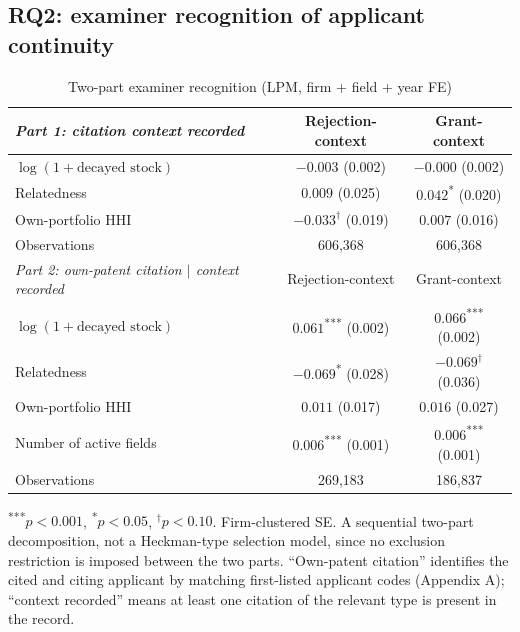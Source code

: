 \documentclass[12pt]{article}
\begin{document}
\subsection{RQ2: examiner recognition of applicant continuity}

\begin{table}[htbp]
\centering
\small
\caption{Two-part examiner recognition (LPM, firm + field + year FE)}
\label{tab:block2}
\begin{tabular}{lcc}
\toprule
\textit{Part 1: citation context recorded} & Rejection-context & Grant-context \\
\midrule
$\log(1+\text{decayed stock})$ & $-0.003$ (0.002) & $-0.000$ (0.002) \\
Relatedness & $0.009$ (0.025) & $0.042$\textsuperscript{*} (0.020) \\
Own-portfolio HHI & $-0.033^{\dagger}$ (0.019) & $0.007$ (0.016) \\
Observations & 606,368 & 606,368 \\
\midrule
\textit{Part 2: own-patent citation $\mid$ context recorded} & Rejection-context & Grant-context \\
\midrule
$\log(1+\text{decayed stock})$ & $0.061$\textsuperscript{***} (0.002) & $0.066$\textsuperscript{***} (0.002) \\
Relatedness & $-0.069$\textsuperscript{*} (0.028) & $-0.069^{\dagger}$ (0.036) \\
Own-portfolio HHI & $0.011$ (0.017) & $0.016$ (0.027) \\
Number of active fields & $0.006$\textsuperscript{***} (0.001) & $0.006$\textsuperscript{***} (0.001) \\
Observations & 269,183 & 186,837 \\
\bottomrule
\end{tabular}
\begin{minipage}{\textwidth}
\vspace{2pt}
\footnotesize \textsuperscript{***}$p<0.001$, \textsuperscript{*}$p<0.05$, $^{\dagger}p<0.10$. Firm-clustered SE. A sequential two-part decomposition, not a Heckman-type selection model, since no exclusion restriction is imposed between the two parts. ``Own-patent citation'' identifies the cited and citing applicant by matching first-listed applicant codes (Appendix A); ``context recorded'' means at least one citation of the relevant type is present in the record.
\end{minipage}
\end{table}
\end{document}
